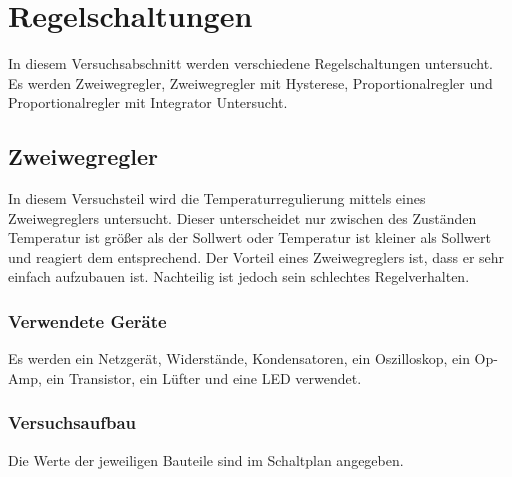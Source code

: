\documentclass[12pt,a4paper]{article}
\begin{document}
\section{Regelschaltungen}
In diesem Versuchsabschnitt werden verschiedene Regelschaltungen untersucht. Es werden Zweiwegregler, Zweiwegregler mit Hysterese, Proportionalregler und Proportionalregler mit Integrator Untersucht.

\subsection{Zweiwegregler}

In diesem Versuchsteil wird die Temperaturregulierung mittels eines Zweiwegreglers untersucht. Dieser unterscheidet nur zwischen des Zuständen Temperatur ist größer als der Sollwert oder Temperatur ist kleiner als Sollwert und reagiert dem entsprechend. Der Vorteil eines Zweiwegreglers ist, dass er sehr einfach aufzubauen ist. Nachteilig ist jedoch sein schlechtes Regelverhalten.

\subsubsection*{Verwendete Geräte}

Es werden ein Netzgerät, Widerstände, Kondensatoren, ein Oszilloskop, ein Op-Amp, ein Transistor, ein Lüfter und eine LED verwendet.


\subsubsection*{Versuchsaufbau}

Die Werte der jeweiligen Bauteile sind im Schaltplan angegeben. 
\end{document}
